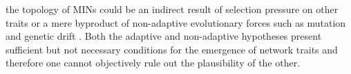         the topology of MINs could be an indirect result of selection pressure on other traits \cite{papp_critical_2009} or
        a mere byproduct of non-adaptive evolutionary forces such as mutation and genetic drift \cite{lynch_evolution_2007, sorrells_making_2015}. Both the adaptive and non-adaptive hypotheses present sufficient but not necessary conditions for the emergence of network traits and therefore one cannot objectively rule out the plausibility of the other.
